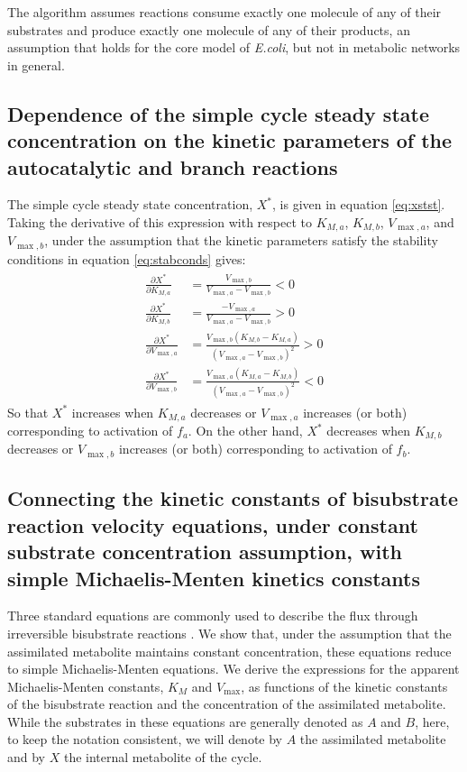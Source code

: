   The algorithm assumes reactions consume exactly one molecule of any of their substrates and produce exactly one molecule of any of their products, an assumption that holds for the core model of \emph{E.coli}, but not in metabolic networks in general.

  \subsection{Dependence of the simple cycle steady state concentration on the kinetic parameters of the autocatalytic and branch reactions}
  The simple cycle steady state concentration, $X^*$, is given in equation \ref{eq:xstst}.
  Taking the derivative of this expression with respect to $K_{M,a}$, $K_{M,b}$, $V_{\max,a}$, and $V_{\max,b}$, under the assumption that the kinetic parameters satisfy the stability conditions in equation \ref{eq:stabconds} gives:
  \begin{align}
      \begin{split}
          \label{eq:ststdep}
    \frac{\partial X^*}{\partial K_{M,a}}&=\frac{V_{\max,b}}{V_{\max,a}-V_{\max,b}}<0 \\
    \frac{\partial X^*}{\partial K_{M,b}}&=\frac{-V_{\max,a}}{V_{\max,a}-V_{\max,b}}>0 \\
    \frac{\partial X^*}{\partial V_{\max,a}}&=\frac{V_{\max,b}(K_{M,b}-K_{M,a})}{(V_{\max,a}-V_{\max,b})^2}>0 \\
    \frac{\partial X^*}{\partial V_{\max,b}}&=\frac{V_{\max,a}(K_{M,a}-K_{M,b})}{(V_{\max,a}-V_{\max,b})^2}<0
      \end{split}
  \end{align}
  So that $X^*$ increases when $K_{M,a}$ decreases or $V_{\max,a}$ increases (or both) corresponding to activation of $f_a$.
  On the other hand, $X^*$ decreases when $K_{M,b}$ decreases or $V_{\max,b}$ increases (or both) corresponding to activation of $f_b$.

  \subsection{Connecting the kinetic constants of bisubstrate reaction velocity equations, under constant substrate concentration assumption, with simple Michaelis-Menten kinetics constants}
  Three standard equations are commonly used to describe the flux through irreversible bisubstrate reactions \cite{Leskovac2003-li}.
  We show that, under the assumption that the assimilated metabolite maintains constant concentration, these equations reduce to simple Michaelis-Menten equations.
  We derive the expressions for the apparent Michaelis-Menten constants, $K_M$ and $V_{\max}$, as functions of the kinetic constants of the bisubstrate reaction and the concentration of the assimilated metabolite.
  While the substrates in these equations are generally denoted as $A$ and $B$, here, to keep the notation consistent, we will denote by $A$ the assimilated metabolite and by $X$ the internal metabolite of the cycle.


